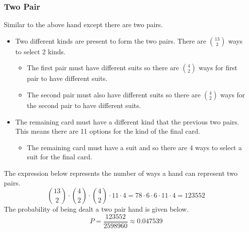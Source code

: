 \subsubsection*{Two Pair}
Similar to the above hand except there are two pairs.
\begin{itemize}
    \item Two different kinds are present to form the two pairs.  There are $\binom{13}{2}$ ways to select 2 kinds.
    \begin{itemize}
        \item The first pair must have different suits so there are $\binom{4}{2}$ ways for first pair to have different suits.
        \item The second pair must also have different suits so there are $\binom{4}{2}$ ways for the second pair to have different suits.
    \end{itemize}
    \item The remaining card must have a different kind that the previous two pairs.  This means there are 11 options for the kind of the final card.
    \begin{itemize}
        \item The remaining card must have a suit and so there are $4$ ways to select a suit for the final card.
    \end{itemize}
\end{itemize}
The expression below represents the number of ways a hand can represent two pairs.
$$\binom{13}{2} \cdot \binom{4}{2} \cdot \binom{4}{2} \cdot 11 \cdot 4 = 78 \cdot 6 \cdot 6 \cdot 11 \cdot 4 = 123552$$
The probability of being dealt a two pair hand is given below.
$$P = \frac{123552}{2598960} \approx 0.047539$$

